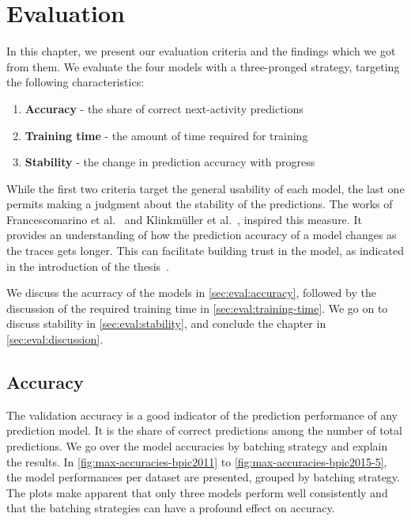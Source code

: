 \chapter{Evaluation}\label{chap:evaluation}
In this chapter, we present our evaluation criteria and the findings which we got from them.
We evaluate the four models with a three-pronged strategy, targeting the following characteristics:

\begin{enumerate}
    \item\textbf{Accuracy} - the share of correct next-activity predictions
    \item\textbf{Training time} - the amount of time required for training
    \item\textbf{Stability} - the change in prediction accuracy with progress
\end{enumerate}

While the first two criteria target the general usability of each model, the last one permits making a judgment about the stability of the predictions. The works of Francescomarino et al.~\cite{francescomarino2015} and Klinkmüller et al.~\cite{klinkmuller2018reliablemonitoring}, inspired this measure. It provides an understanding of how the prediction accuracy of a model changes as the traces gets longer. This can facilitate building trust in the model, as indicated in the introduction of the thesis~\cite{klinkmuller2018reliablemonitoring, boehmer2018probability}.

We discuss the acurracy of the models in \autoref{sec:eval:accuracy}, followed by the discussion of the required training time in \autoref{sec:eval:training-time}. We go on to discuss stability in \autoref{sec:eval:stability}, and conclude the chapter in \autoref{sec:eval:discussion}.

\section{Accuracy}\label{sec:eval:accuracy}
The validation accuracy is a good indicator of the prediction performance of any prediction model. It is the share of correct predictions among the number of total predictions. We go over the model accuracies by batching strategy and explain the results. In \autoref{fig:max-accuracies-bpic2011} to \autoref{fig:max-accuracies-bpic2015-5}, the model performances per dataset are presented, grouped by batching strategy. The plots make apparent that only three models perform well consistently and that the batching strategies can have a profound effect on accuracy.\\

